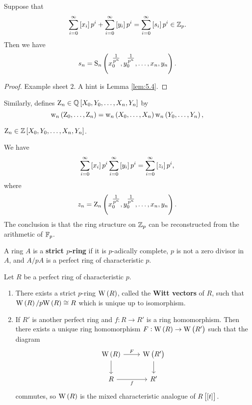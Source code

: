 \begin{theorem}
Suppose that
$$ \sum_{i = 0}^\infty \sbr{x_i}p^i + \sum_{i = 0}^\infty \sbr{y_i}p^i = \sum_{i = 0}^\infty \sbr{s_i}p^i \in \ZZ_p. $$
Then we have
$$ s_n = \S_n\br{x_0^{\tfrac{1}{p^n}}, y_0^{\tfrac{1}{p^n}}, \dots, x_n, y_n}. $$
\end{theorem}

\begin{proof}
Example sheet $ 2 $. A hint is Lemma \ref{lem:5.4}.
\end{proof}

Similarly, defines $ \Z_n \in \QQ\sbr{X_0, Y_0, \dots, X_n, Y_n} $ by
$$ \w_n\br{\Z_0, \dots, \Z_n} = \w_n\br{X_0, \dots, X_n}\w_n\br{Y_0, \dots, Y_n}, $$

\begin{fact*}[Witt]
$ \Z_n \in \ZZ\sbr{X_0, Y_0, \dots, X_n, Y_n} $.
\end{fact*}

We have
$$ \sum_{i = 0}^\infty \sbr{x_i}p^i\sum_{i = 0}^\infty \sbr{y_i}p^i = \sum_{i = 0}^\infty \sbr{z_i}p^i, $$
where
$$ z_n = \Z_n\br{x_0^{\tfrac{1}{p^n}}, y_0^{\tfrac{1}{p^n}}, \dots, x_n, y_n}. $$
The conclusion is that the ring structure on $ \mathbb{Z}_p $ can be reconstructed from the arithmetic of $ \mathbb{F}_p $.

\begin{definition}
A ring $ A $ is a \textbf{strict $ p $-ring} if it is $ p $-adically complete, $ p $ is not a zero divisor in $ A $, and $ A / pA $ is a perfect ring of characteristic $ p $.
\end{definition}

\begin{theorem}
Let $ R $ be a perfect ring of characteristic $ p $.
\begin{enumerate}
\item There exists a strict $ p $-ring $ \W\br{R} $, called the \textbf{Witt vectors} of $ R $, such that $ \W\br{R} / p\W\br{R} \cong R $ which is unique up to isomorphism.
\item If $ R' $ is another perfect ring and $ f : R \to R' $ is a ring homomorphism. Then there exists a unique ring homomorphism $ F : \W\br{R} \to \W\br{R'} $ such that the diagram
$$
\begin{tikzcd}
\W\br{R} \arrow{r}{F} \arrow{d} & \W\br{R'} \arrow{d} \\
R \arrow{r}[swap]{f} & R'
\end{tikzcd}
$$
commutes, so $ \W\br{R} $ is the mixed characteristic analogue of $ R\sbr{\sbr{t}} $.
\end{enumerate}
\end{theorem}

